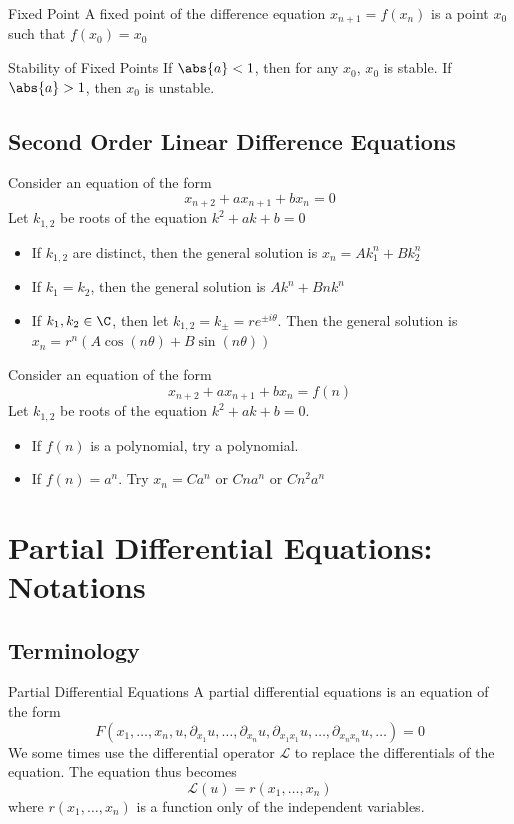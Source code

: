 \documentclass[a4paper]{article}
\begin{document}
\begin{defn}{Fixed Point}{} A fixed point of the difference equation $x_{n+1}=f(x_n)$ is a point $x_0$ such that $f(x_0)=x_0$
\end{defn}

\begin{prp}{Stability of Fixed Points}{} If $\abs{a}<1$, then for any $x_0$, $x_0$ is stable. If $\abs{a}>1$, then $x_0$ is unstable. 
\end{prp}

\subsection{Second Order Linear Difference Equations}
\begin{thm}{}{} Consider an equation of the form $$x_{n+2}+ax_{n+1}+bx_n=0$$ Let $k_{1,2}$ be roots of the equation $k^2+ak+b=0$
\begin{itemize}
\item If $k_{1,2}$ are distinct, then the general solution is $x_n=Ak_1^n+Bk_2^n$
\item If $k_1=k_2$, then the general solution is $Ak^n+Bnk^n$
\item If $k_1,k_2\in\C$, then let $k_{1,2}=k_{\pm}=re^{\pm i\theta}$. Then the general solution is $x_n=r^n(A\cos(n\theta)+B\sin(n\theta))$
\end{itemize}
\end{thm}

\begin{thm}{}{} Consider an equation of the form $$x_{n+2}+ax_{n+1}+bx_n=f(n)$$ Let $k_{1,2}$ be roots of the equation $k^2+ak+b=0$. 
\begin{itemize}
\item If $f(n)$ is a polynomial, try a polynomial. 
\item If $f(n)=a^n$. Try $x_n=Ca^n$ or $Cna^n$ or $Cn^2a^n$
\end{itemize}
\end{thm}

\pagebreak
\section{Partial Differential Equations: Notations}
\subsection{Terminology}
\begin{defn}{Partial Differential Equations}{} A partial differential equations is an equation of the form $$F(x_1,\dots,x_n,u,\partial_{x_1}u,\dots,\partial_{x_n}u,\partial_{x_1x_1}u,\dots,\partial_{x_nx_n}u,\dots)=0$$ We some times use the differential operator $\mathcal{L}$ to replace the differentials of the equation. The equation thus becomes $$\mathcal{L}(u)=r(x_1,\dots,x_n)$$ where $r(x_1,\dots,x_n)$ is a function only of the independent variables. 
\end{defn}
\end{document}

